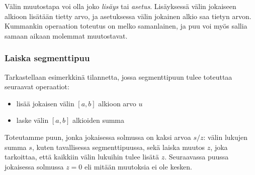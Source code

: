 Välin muutostapa voi olla joko
\textit{lisäys} tai \textit{asetus}.
Lisäyksessä välin jokaiseen alkioon lisätään
tietty arvo, ja asetuksessa välin
jokainen alkio saa tietyn arvon.
Kummankin operaation toteutus on melko samanlainen,
ja puu voi myös sallia samaan aikaan
molemmat muutostavat.

\subsubsection{Laiska segmenttipuu}

Tarkastellaan esimerkkinä tilannetta,
jossa segmenttipuun
tulee toteuttaa seuraavat operaatiot:
\begin{itemize}
\item lisää jokaisen välin $[a,b]$ alkioon arvo $u$
\item laske välin $[a,b]$ alkioiden summa
\end{itemize}
Toteutamme puun, jonka jokaisessa
solmussa on kaksi arvoa $s/z$:
välin lukujen summa $s$,
kuten tavallisessa segmenttipuussa, sekä
laiska muutos $z$,
joka tarkoittaa,
että kaikkiin välin lukuihin tulee lisätä $z$.
Seuraavassa puussa jokaisessa solmussa $z=0$
eli mitään muutoksia ei ole kesken.
